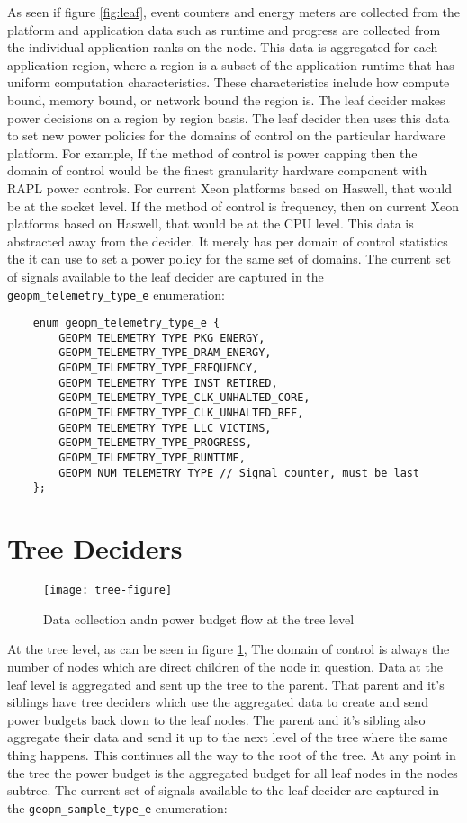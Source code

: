\documentclass[11pt]{article}
\begin{document}
As seen if figure \ref{fig:leaf}, event counters and energy meters are
collected from the platform and application data such as runtime and
progress are collected from the individual application ranks on the
node. This data is aggregated for each application region, where a
region is a subset of the application runtime that has uniform
computation characteristics. These characteristics include how compute
bound, memory bound, or network bound the region is. The leaf decider
makes power decisions on a region by region basis. The leaf decider
then uses this data to set new power policies for the domains of
control on the particular hardware platform. For example, If the
method of control is power capping then the domain of control would be
the finest granularity hardware component with RAPL power
controls. For current Xeon platforms based on Haswell, that would be
at the socket level. If the method of control is frequency, then on
current Xeon platforms based on Haswell, that would be at the CPU
level. This data is abstracted away from the decider. It merely has
per domain of control statistics the it can use to set a power policy
for the same set of domains. The current set of signals available to
the leaf decider are captured in the \verb#geopm_telemetry_type_e#
enumeration:

\begin{verbatim}
    enum geopm_telemetry_type_e {
        GEOPM_TELEMETRY_TYPE_PKG_ENERGY,
        GEOPM_TELEMETRY_TYPE_DRAM_ENERGY,
        GEOPM_TELEMETRY_TYPE_FREQUENCY,
        GEOPM_TELEMETRY_TYPE_INST_RETIRED,
        GEOPM_TELEMETRY_TYPE_CLK_UNHALTED_CORE,
        GEOPM_TELEMETRY_TYPE_CLK_UNHALTED_REF,
        GEOPM_TELEMETRY_TYPE_LLC_VICTIMS,
        GEOPM_TELEMETRY_TYPE_PROGRESS,
        GEOPM_TELEMETRY_TYPE_RUNTIME,
        GEOPM_NUM_TELEMETRY_TYPE // Signal counter, must be last
    };
\end{verbatim}

\section{Tree Deciders}
\begin{figure} [H]
  \centering
  \texttt{[image: tree-figure]}
  \caption{Data collection andn power budget flow at the tree level}
  \label{fig:tree}
\end{figure}

At the tree level, as can be seen in figure \ref{fig:tree}, The domain
of control is always the number of nodes which are direct children of
the node in question. Data at the leaf level is aggregated and sent up
the tree to the parent. That parent and it’s siblings have tree
deciders which use the aggregated data to create and send power
budgets back down to the leaf nodes. The parent and it’s sibling also
aggregate their data and send it up to the next level of the tree
where the same thing happens. This continues all the way to the root
of the tree. At any point in the tree the power budget is the
aggregated budget for all leaf nodes in the nodes subtree. The current
set of signals available to the leaf decider are captured in the
\verb#geopm_sample_type_e# enumeration:
\end{document}
